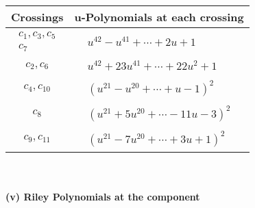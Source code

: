 \documentclass[1p]{elsarticle_modified}
\theoremstyle{definition}
\begin{document}
\begin{tabular}{m{50pt}|m{274pt}}
Crossings & \hspace{64pt}u-Polynomials at each crossing \\
\hline $$\begin{aligned}c_{1},c_{3},c_{5}\\c_{7}\end{aligned}$$&$\begin{aligned}
&u^{42}- u^{41}+\cdots+2 u+1
\end{aligned}$\\
\hline $$\begin{aligned}c_{2},c_{6}\end{aligned}$$&$\begin{aligned}
&u^{42}+23 u^{41}+\cdots+22 u^2+1
\end{aligned}$\\
\hline $$\begin{aligned}c_{4},c_{10}\end{aligned}$$&$\begin{aligned}
&(u^{21}- u^{20}+\cdots+u-1)^{2}
\end{aligned}$\\
\hline $$\begin{aligned}c_{8}\end{aligned}$$&$\begin{aligned}
&(u^{21}+5 u^{20}+\cdots-11 u-3)^{2}
\end{aligned}$\\
\hline $$\begin{aligned}c_{9},c_{11}\end{aligned}$$&$\begin{aligned}
&(u^{21}-7 u^{20}+\cdots+3 u+1)^{2}
\end{aligned}$\\
\hline
\end{tabular}\\~\\
\newpage\renewcommand{\arraystretch}{1}
\flushleft \textbf{(v) Riley Polynomials at the component}\newline \\
\end{document}
